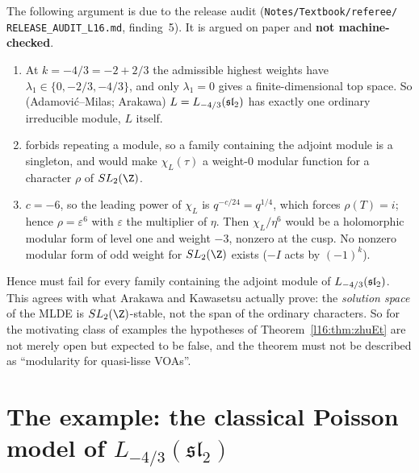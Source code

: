 \begin{warning}[title={\texttt{hrank} is expected to fail at $L_{-4/3}(\mathfrak{sl}_2)$ (paper argument, release audit)}]
The following argument is due to the release audit (\texttt{Notes/\allowbreak Textbook/\allowbreak referee/\allowbreak
RELEASE\_AUDIT\_L16.md}, finding~5). It is argued on paper and \textbf{not machine-checked}.
\begin{enumerate}
\item At $k=-4/3=-2+2/3$ the admissible highest weights have $\lambda_1\in\{0,-2/3,-4/3\}$, and only $\lambda_1 = 0$ gives a
  finite-dimensional top space. So (Adamovi\'c--Milas; Arakawa) $L = L_{-4/3}(\mathfrak{sl}_2)$ has exactly one ordinary
  irreducible module, $L$ itself.
\item {} forbids repeating a module, so a family containing the adjoint module is a singleton, and
   would make $\chi_L(\tau)$ a weight-$0$ modular function for a character $\rho$ of
  $SL_2(\Z)$.
\item $c=-6$, so the leading power of $\chi_L$ is $q^{-c/24} = q^{1/4}$, which forces $\rho(T) = i$; hence $\rho = \varepsilon^6$
  with $\varepsilon$ the multiplier of $\eta$. Then $\chi_L/\eta^6$ would be a holomorphic modular form of level one and
  weight $-3$, nonzero at the cusp. No nonzero modular form of odd weight for $SL_2(\Z)$ exists ($-I$ acts by $(-1)^k$).
\end{enumerate}
Hence  must fail for every family containing the adjoint module of $L_{-4/3}(\mathfrak{sl}_2)$. This agrees with
what Arakawa and Kawasetsu actually prove: the \emph{solution space} of the MLDE is $SL_2(\Z)$-stable, not the span of
the ordinary characters. So for the motivating class of examples the hypotheses of Theorem~\ref{l16:thm:zhuEt} are not
merely open but expected to be false, and the theorem must not be described as ``modularity for quasi-lisse VOAs''.
\end{warning}

\section{The example: the classical Poisson model of $L_{-4/3}(\mathfrak{sl}_2)$}\label{l16:sec:model}

